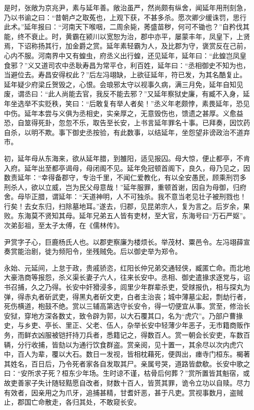 \documentclass[]{article}
\begin{document}
是时，张敞为京兆尹，素与延年善。敞治虽严，然尚颇有纵舍，闻延年用刑刻急，乃以书谕之曰：``昔朝卢之取菟也，上观下获，不甚多杀。愿次卿少缓诛罚，思行此术。''延年报曰：``河南天下喉咽，二周余毙，莠盛苗秽，何可不锄也？''自矜伐其能，终不衰止。时，黄霸在颍川以宽恕为治，郡中亦平，屡蒙丰年，凤皇下，上贤焉，下诏称扬其行，加金爵之赏。延年素轻霸为人，及比郡为守，褒赏反在己前，心内不服。河南界中又有蝗虫，府丞义出行蝗，还见延年，延年曰：``此蝗岂凤皇食邪？''义又道司农中丞耿寿昌为常平仓，利百姓，延年曰：``丞相御史不知为也，当避位去。寿昌安得权此？''后左冯翊缺，上欲征延年，符已发，为其名酷复止。延年疑少府梁丘贺毁之，心恨。会琅邪太守以视事久病，满三月免，延年自知见废，谓丞曰：``此人尚能去官，我反不能去邪？''又延年察狱史廉，有臧不入身，延年坐选举不实贬秩，笑曰：``后敢复有举人者矣！''丞义年老颇悖，素畏延年，恐见中伤。延年本尝与义俱为丞相史，实亲厚之，无意毁伤也，馈遗之甚厚。义愈益恐，自筮得死卦，忽忽不乐，取告至长安，上书言延年罪名十事。已拜奏，因饮药自杀，以明不欺。事下御史丞按验，有此数事，以结延年，坐怨望非谤政治不道弃市。

初，延年母从东海来，欲从延年腊，到雒阳，适见报囚。母大惊，便止都亭，不肯入府。延年出至都亭谒母，母闭阁不见。延年免冠顿首阁下，良久，母乃见之，因数责延年：``幸得备郡守，专治千里，不闻仁爱教化，有以全安愚民，顾乘刑罚多刑杀人，欲以立威，岂为民父母意哉！''延年服罪，重顿首谢，因自为母御，归府舍。母毕正腊，谓延年：``天道神明，人不可独杀。我不意当老见壮子被刑戮也！行矣！去女东归，扫除墓地耳。''遂去，归郡，见昆弟宗人，复为言之。后岁余，果败。东海莫不贤知其母。延年兄弟五人皆有吏材，至大官，东海号曰``万石严妪''。次弟彭祖，至太子太傅，在《儒林传》。

尹赏字子心，巨鹿杨氏人也。以郡吏察廉为楼烦长。举茂材、粟邑令。左冯翊薛宣奏赏能治剧，徙为频阳令，坐残贼免。后以御史举为郑令。

永始、元延间，上怠于政，贵戚骄恣，红阳长仲兄弟交通轻侠，臧匿亡命。而北地大豪浩商等报怨，杀义渠长妻子六人，往来长安中。丞相、御史遣掾求逐党与，诏书召捕，久之乃得。长安中奸猾浸多，闾里少年群辈杀吏，受赇报仇，相与探丸为弹，得赤丸者斫武吏，得黑丸者斫文吏，白者主治丧；城中薄墓尘起，剽劫行者，死伤横道，枹鼓不绝。赏以三辅高第选守长安令，得一切便宜从事。赏至，修治长安狱，穿地方深各数丈，致令辟为郭，以大石覆其口，名为``虎穴''。乃部户曹掾史，与乡吏、亭长、里正、父老、伍人，杂举长安中轻薄少年恶子，无市籍商贩作务，而鲜衣凶服被铠扞持刀兵者，悉籍记之，得数百人。赏一朝会长安吏，车数百辆，分行收捕，皆劾以为通行饮食群盗。赏亲阅，见十置一，其余尽以次内虎穴中，百人为辈，覆以大石。数日一发视，皆相枕藉死，便舆出，瘗寺门桓东。楬著其姓名，百日后，乃令死者家各自发取其尸。亲属号哭，道路皆歔欷。长安中歌之曰：``安所求子死？桓东少年场。生时谅不谨，枯骨后何葬？''赏所置皆其魁宿，或故吏善家子失计随轻黠愿自改者，财数十百人，皆贳其罪，诡令立功以自赎。尽力有效者，因亲用之为爪牙，追捕甚精，甘耆奸恶，甚于凡吏。赏视事数月，盗贼止，郡国亡命散走，各归其处，不敢窥长安。
\end{document}
